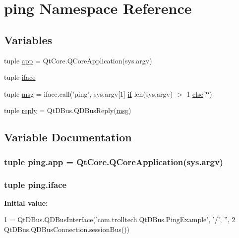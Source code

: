 \hypertarget{namespaceping}{}\section{ping Namespace Reference}
\label{namespaceping}
\subsection*{Variables}
\begin{DoxyCompactItemize}
\item 
tuple \hyperlink{namespaceping_a40e588922730fbc261ceb938e6c9c694}{app} = Qt\+Core.\+Q\+Core\+Application(sys.\+argv)
\item 
tuple \hyperlink{namespaceping_a4947416934e8d8681ec3d9adf042b2ef}{iface}
\item 
tuple \hyperlink{namespaceping_a546aa4b8583f8e76cd3fa14a84836419}{msg} = iface.\+call('ping', sys.\+argv\mbox{[}1\mbox{]} \hyperlink{minmax_8h_a30a0ee9fee303f01d9c5e6f669e0dfe9}{if} len(sys.\+argv) $>$ 1 \hyperlink{scores_8php_a0544c3fe466e421738dae463968b70ba}{else} \char`\"{}\char`\"{})
\item 
tuple \hyperlink{namespaceping_af1508c5b7666739548f17500c09d5653}{reply} = Qt\+D\+Bus.\+Q\+D\+Bus\+Reply(\hyperlink{namespaceping_a546aa4b8583f8e76cd3fa14a84836419}{msg})
\end{DoxyCompactItemize}


\subsection{Variable Documentation}
\hypertarget{namespaceping_a40e588922730fbc261ceb938e6c9c694}{}
\subsubsection[{app}]{\setlength{\rightskip}{0pt plus 5cm}tuple ping.\+app = Qt\+Core.\+Q\+Core\+Application(sys.\+argv)}\label{namespaceping_a40e588922730fbc261ceb938e6c9c694}
\hypertarget{namespaceping_a4947416934e8d8681ec3d9adf042b2ef}{}
\subsubsection[{iface}]{\setlength{\rightskip}{0pt plus 5cm}tuple ping.\+iface}\label{namespaceping_a4947416934e8d8681ec3d9adf042b2ef}
{\bfseries Initial value\+:}
\begin{DoxyCode}
1 = QtDBus.QDBusInterface(\textcolor{stringliteral}{'com.trolltech.QtDBus.PingExample'}, \textcolor{stringliteral}{'/'}, \textcolor{stringliteral}{''},
2             QtDBus.QDBusConnection.sessionBus())
\end{DoxyCode}
\hypertarget{namespaceping_a546aa4b8583f8e76cd3fa14a84836419}{}
